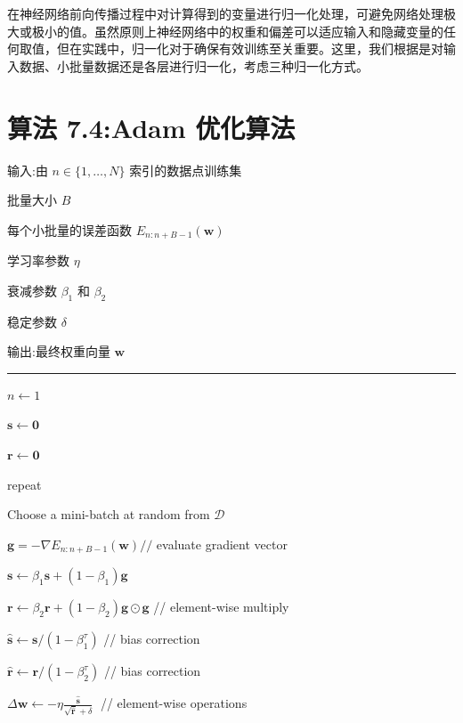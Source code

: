 \documentclass[10pt]{report}
\newcommand{\HRule}{\begin{center}\rule{0.9\linewidth}{0.2mm}\end{center}}
\begin{document}
在神经网络前向传播过程中对计算得到的变量进行归一化处理，可避免网络处理极大或极小的值。虽然原则上神经网络中的权重和偏差可以适应输入和隐藏变量的任何取值，但在实践中，归一化对于确保有效训练至关重要。这里，我们根据是对输入数据、小批量数据还是各层进行归一化，考虑三种归一化方式。

\section*{算法 7.4:Adam 优化算法}

输入:由 \(n \in  \{ 1,\ldots ,N\}\) 索引的数据点训练集

批量大小 \(B\)

每个小批量的误差函数 \({E}_{n : n + B - 1}\left( \mathbf{w}\right)\)

学习率参数 \(\eta\)

衰减参数 \({\beta }_{1}\) 和 \({\beta }_{2}\)

稳定参数 \(\delta\)

输出:最终权重向量 \(\mathbf{w}\)

\HRule

\(n \leftarrow  1\)

\(\mathbf{s} \leftarrow  \mathbf{0}\)

\(\mathbf{r} \leftarrow  \mathbf{0}\)

repeat

\hspace*{1em} Choose a mini-batch at random from \(\mathcal{D}\)

\hspace*{1em} \(\mathbf{g} =  - \nabla {E}_{n : n + B - 1}\left( \mathbf{w}\right) //\) evaluate gradient vector

\hspace*{1em} \(\mathbf{s} \leftarrow  {\beta }_{1}\mathbf{s} + \left( {1 - {\beta }_{1}}\right) \mathbf{g}\)

\hspace*{1em} \(\mathbf{r} \leftarrow  {\beta }_{2}\mathbf{r} + \left( {1 - {\beta }_{2}}\right) \mathbf{g} \odot  \mathbf{g}\) // element-wise multiply

\hspace*{1em} \(\widehat{\mathbf{s}} \leftarrow  \mathbf{s}/\left( {1 - {\beta }_{1}^{\tau }}\right)\) // bias correction

\hspace*{1em} \(\widehat{\mathbf{r}} \leftarrow  \mathbf{r}/\left( {1 - {\beta }_{2}^{\tau }}\right)\) // bias correction

\hspace*{1em} \(\Delta \mathbf{w} \leftarrow   - \eta \frac{\widehat{\mathbf{s}}}{\sqrt{\widehat{\mathbf{r}}} + \delta }\;\) // element-wise operations
\end{document}
